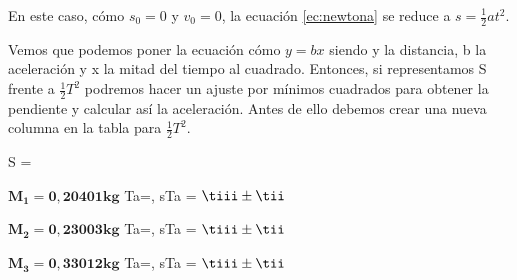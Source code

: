 \documentclass[12pt, a4paper, titlepage]{article}
\begin{document}
  En este caso, cómo $s_0 = 0$ y $v_0 = 0$, la ecuación \ref{ec:newtona} se reduce a $s = \frac{1}{2}at^2$.

  Vemos que podemos poner la ecuación cómo $y = bx$ siendo y la distancia, b la aceleración y x la mitad del tiempo al cuadrado. Entonces, si representamos S frente a $\frac{1}{2}T^2$ podremos hacer un ajuste por mínimos cuadrados para obtener la pendiente y calcular así la aceleración. Antes de ello debemos crear una nueva columna en la tabla para $\frac{1}{2}T^2$.

  \begin{center}
    \vspace{0.3cm}
    \begin{minipage}[H]{0.12\textwidth}
      \centering
      \vspace{0.40cm}
        {S = \Si}
        {\Si}
    \end{minipage}
    \begin{minipage}[H]{0.27\textwidth}
      \centering
      $\mathbf{M_1 = 0,20401kg}$
        {Ta=\tiii, sTa = \tii}
        {$\tiii \pm \tii$}
    \end{minipage}
    \begin{minipage}[H]{0.27\textwidth}
      \centering
      $\mathbf{M_2 = 0,23003kg}$
        {Ta=\tiii, sTa = \tii}
        {$\tiii \pm \tii$}
    \end{minipage}
    \begin{minipage}[H]{0.27\textwidth}
      \centering
      $\mathbf{M_3 = 0,33012kg}$
        {Ta=\tiii, sTa = \tii}
        {$\tiii \pm \tii$}
    \end{minipage}
    \vspace{0.3cm}
  \end{center}
\end{document}
